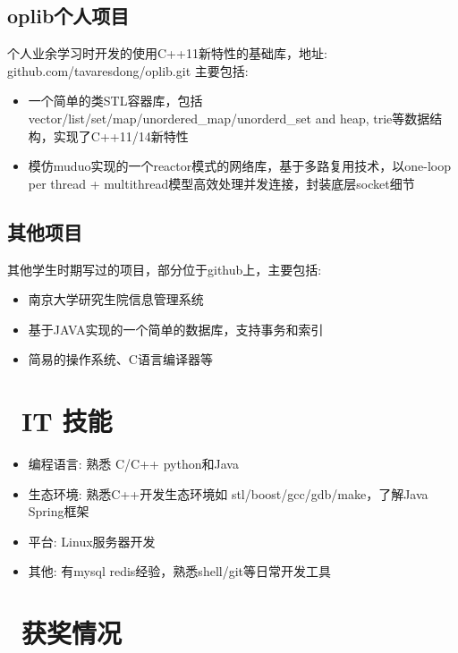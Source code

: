 \documentclass{resume}
\begin{document}
\subsection{\textbf{oplib个人项目}}
个人业余学习时开发的使用C++11新特性的基础库，地址:
github.com/tavaresdong/oplib.git
主要包括:
\begin{itemize}
  \item 一个简单的类STL容器库，包括 vector/list/set/map/unordered\_map/unorderd\_set and heap, trie等数据结构，实现了C++11/14新特性
  \item 模仿muduo实现的一个reactor模式的网络库，基于多路复用技术，以one-loop per thread + multithread模型高效处理并发连接，封装底层socket细节
\end{itemize}

\subsection{\textbf{其他项目}}
其他学生时期写过的项目，部分位于github上，主要包括:
\begin{itemize}
  \item 南京大学研究生院信息管理系统
  \item 基于JAVA实现的一个简单的数据库，支持事务和索引
  \item 简易的操作系统、C语言编译器等
\end{itemize}

\section{\faCogs\ IT 技能}
\begin{itemize}[parsep=0.5ex]
  \item 编程语言: 熟悉 C/C++ python和Java
  \item 生态环境: 熟悉C++开发生态环境如 stl/boost/gcc/gdb/make，了解Java Spring框架
  \item 平台: Linux服务器开发
  \item 其他: 有mysql redis经验，熟悉shell/git等日常开发工具
\end{itemize}

\section{\faHeartO\ 获奖情况}
\end{document}
